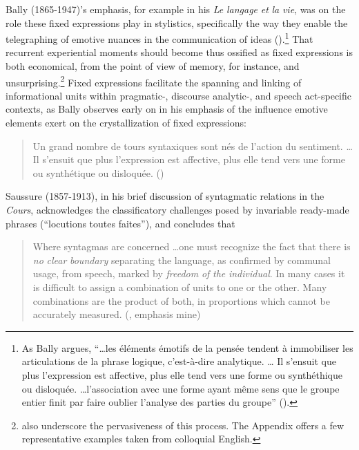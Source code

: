 \documentclass[output=paper]{langsci/langscibook}
\begin{document}
Bally (1865-1947)’s emphasis, for example in his \textit{Le} \textit{langage} \textit{et} \textit{la} \textit{vie}, was on the role these fixed expressions play in stylistics, specifically the way they enable the telegraphing of emotive nuances in the communication of ideas (\citeyear[141]{bally__langage_1952}).\footnote{ \textrm{As Bally argues, “…les éléments émotifs de la pensée tendent à immobiliser les articulations de la phrase logique, c’est-à-dire analytique. … Il s’ensuit que plus l’expression est affective, plus elle tend vers une forme ou synthéthique ou disloquée. …l’association avec une forme ayant même sens que le groupe entier finit par faire oublier l’analyse des parties du groupe” (\citeyear[68]{bally__langage_1952}).} } That recurrent experiential moments should become thus ossified as fixed expressions is both economical, from the point of view of memory, for instance, and unsurprising.\footnote{\citet[191]{richards_two_1983} also underscore the pervasiveness of this process. The Appendix offers a few representative examples taken from colloquial English.} Fixed expressions facilitate the spanning and linking of informational units within pragmatic-, discourse analytic-, and speech act-specific contexts, as Bally observes early on in his emphasis of the influence emotive elements exert on the crystallization of fixed expressions: 

\begin{quote}
    Un grand nombre de tours syntaxiques sont nés de l’action du sentiment. …Il s’ensuit que plus l’expression est affective, plus elle tend vers une forme ou synthétique ou disloquée. (\citeyear[68]{bally__langage_1952})
\end{quote}

Saussure (1857-1913), in his brief discussion of syntagmatic relations in the \textit{Cours}, acknowledges the classificatory challenges posed by invariable ready-made phrases (“locutions toutes faites”), and concludes that

\begin{quote}
    Where syntagmas are concerned …one must recognize the fact that there is \textit{no} \textit{clear} \textit{boundary} separating the language, as confirmed by communal usage, from speech, marked by \textit{freedom} \textit{of} \textit{the} \textit{individual}. In many cases it is difficult to assign a combination of units to one or the other. Many combinations are the product of both, in proportions which cannot be accurately measured. (\citeyear[123]{saussure_cours_1986}, emphasis mine)
\end{quote}
\end{document}
